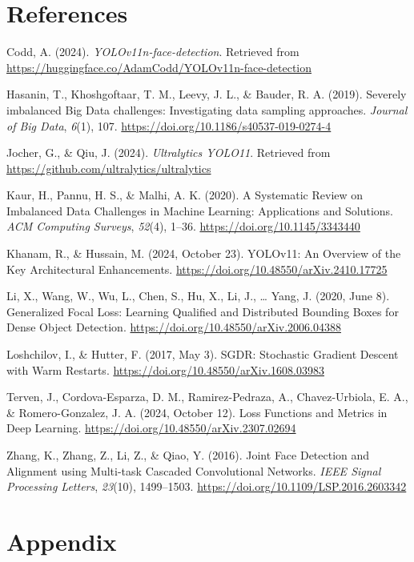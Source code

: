 \documentclass[
  man,floatsintext]{apa6}
\newlength{\cslhangindent}
\newenvironment{CSLReferences}[2] %
 {\begin{list}{}{%
  \setlength{\itemindent}{0pt}
  \setlength{\leftmargin}{0pt}
  \setlength{\parsep}{0pt}
  \ifodd #1
   \setlength{\leftmargin}{\cslhangindent}
   \setlength{\itemindent}{-1\cslhangindent}
  \fi
  \setlength{\itemsep}{#2\baselineskip}}}
 {\end{list}}
\begin{document}
\newpage

\section{References}\label{references-1}

\begingroup
\setlength{\parindent}{-0.5in}
\setlength{\leftskip}{0.5in}

\label{refs}
\begin{CSLReferences}{1}{0}
Codd, A. (2024). \emph{{YOLOv11n-face-detection}}. Retrieved from \url{https://huggingface.co/AdamCodd/YOLOv11n-face-detection}

Hasanin, T., Khoshgoftaar, T. M., Leevy, J. L., \& Bauder, R. A. (2019). Severely imbalanced {Big Data} challenges: Investigating data sampling approaches. \emph{Journal of Big Data}, \emph{6}(1), 107. \url{https://doi.org/10.1186/s40537-019-0274-4}

Jocher, G., \& Qiu, J. (2024). \emph{Ultralytics {YOLO11}}. Retrieved from \url{https://github.com/ultralytics/ultralytics}

Kaur, H., Pannu, H. S., \& Malhi, A. K. (2020). A {Systematic Review} on {Imbalanced Data Challenges} in {Machine Learning}: {Applications} and {Solutions}. \emph{ACM Computing Surveys}, \emph{52}(4), 1--36. \url{https://doi.org/10.1145/3343440}

Khanam, R., \& Hussain, M. (2024, October 23). {YOLOv11}: {An Overview} of the {Key Architectural Enhancements}. \url{https://doi.org/10.48550/arXiv.2410.17725}

Li, X., Wang, W., Wu, L., Chen, S., Hu, X., Li, J., \ldots{} Yang, J. (2020, June 8). Generalized {Focal Loss}: {Learning Qualified} and {Distributed Bounding Boxes} for {Dense Object Detection}. \url{https://doi.org/10.48550/arXiv.2006.04388}

Loshchilov, I., \& Hutter, F. (2017, May 3). {SGDR}: {Stochastic Gradient Descent} with {Warm Restarts}. \url{https://doi.org/10.48550/arXiv.1608.03983}

Terven, J., Cordova-Esparza, D. M., Ramirez-Pedraza, A., Chavez-Urbiola, E. A., \& Romero-Gonzalez, J. A. (2024, October 12). Loss {Functions} and {Metrics} in {Deep Learning}. \url{https://doi.org/10.48550/arXiv.2307.02694}

Zhang, K., Zhang, Z., Li, Z., \& Qiao, Y. (2016). Joint {Face Detection} and {Alignment} using {Multi-task Cascaded Convolutional Networks}. \emph{IEEE Signal Processing Letters}, \emph{23}(10), 1499--1503. \url{https://doi.org/10.1109/LSP.2016.2603342}

\end{CSLReferences}

\endgroup

\newpage

\section{Appendix}\label{appendix}
\end{document}
